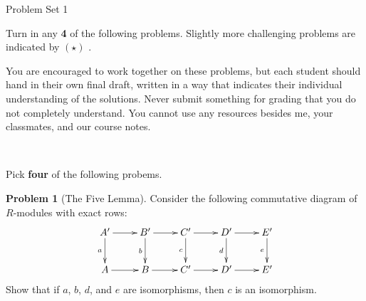 \documentclass[11pt]{article}
\title{}
\date{\vspace{-0.5in}}
\theoremstyle{definition}
\newtheorem{problem}{Problem}
\begin{document}
\thispagestyle{fancy}
\pagestyle{fancy}

\vspace{3em}

\begin{center}
	{\LARGE Problem Set 1}
\end{center}


\vspace{0.5em}


\noindent
Turn in any {\bf 4} of the following problems. 
Slightly more challenging problems are indicated by $(\star)$ .

%
\noindent
You are encouraged to work together on these problems, but each student should hand in their own final draft, written in a way that indicates their individual understanding of the solutions. Never submit something for grading that you do not completely understand. You cannot use any resources besides me, your classmates, and our course notes.
%
%


\

\noindent
Pick {\bf four} of the following probems.

\begin{problem}[The Five Lemma]
Consider the following commutative diagram of $R$-modules with exact rows:
$$\xymatrix{A' \ar[d]_-a \ar[r] & B' \ar[r] \ar[d]_-b & C' \ar[r] \ar[d]_-c & D' \ar[d]_-d \ar[r] & E' \ar[d]_-e \\
	A \ar[r] & B \ar[r] & C' \ar[r] & D' \ar[r] & E'}$$
Show that if $a$, $b$, $d$, and $e$ are isomorphisms, then $c$ is an isomorphism.
\end{problem}


\vfill
\end{document}
